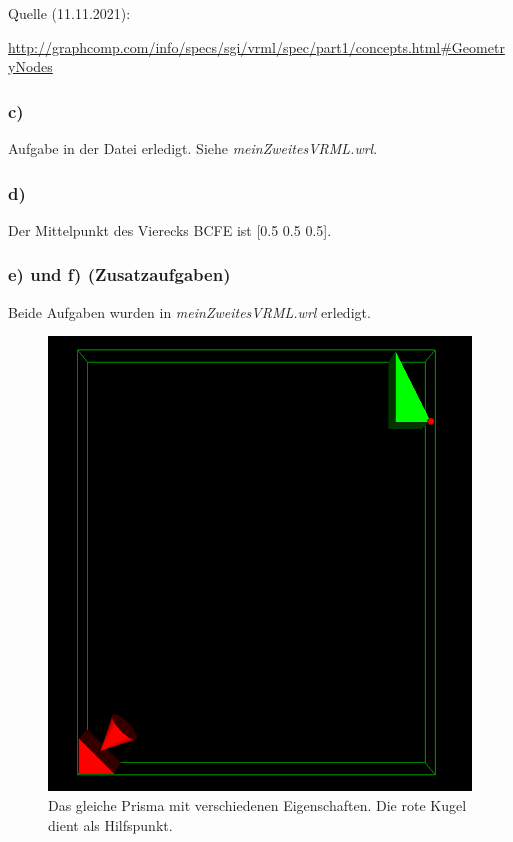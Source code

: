 \documentclass{article}
\begin{document}
 Quelle (11.11.2021):
 
 \url{http://graphcomp.com/info/specs/sgi/vrml/spec/part1/concepts.html#GeometryNodes}

\subsubsection*{c)}
Aufgabe in der Datei erledigt. Siehe \textit{meinZweitesVRML.wrl}.

\subsubsection*{d)}
Der Mittelpunkt des Vierecks BCFE ist [0.5 0.5 0.5].

\subsubsection*{e) und f) (Zusatzaufgaben)}
Beide Aufgaben wurden in \textit{meinZweitesVRML.wrl} erledigt.

\begin{figure}[h]
    \centering
    \includegraphics[scale=0.375]{V2_e_und_f.png}
    \caption{Das gleiche Prisma mit verschiedenen Eigenschaften. Die rote Kugel dient als Hilfspunkt.}
\end{figure}
\end{document}
